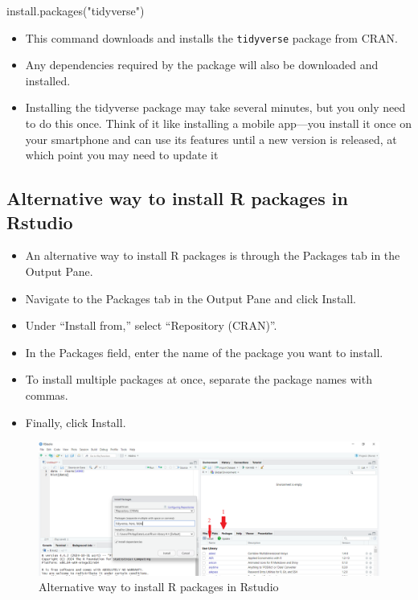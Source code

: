 \documentclass[
  letterpaper,
  DIV=11,
  numbers=noendperiod]{scrreprt}
\newenvironment{Shaded}{\begin{snugshade}}{\end{snugshade}}
\newcommand{\FunctionTok}[1]{\textcolor[rgb]{0.28,0.35,0.67}{#1}}
\newcommand{\NormalTok}[1]{\textcolor[rgb]{0.00,0.23,0.31}{#1}}
\newcommand{\StringTok}[1]{\textcolor[rgb]{0.13,0.47,0.30}{#1}}
\begin{document}
\begin{Shaded}
\begin{Highlighting}[]
\FunctionTok{install.packages}\NormalTok{(}\StringTok{"tidyverse"}\NormalTok{)}
\end{Highlighting}
\end{Shaded}

\begin{itemize}
\item
  This command downloads and installs the \texttt{tidyverse} package
  from CRAN.
\item
  Any dependencies required by the package will also be downloaded and
  installed.
\item
  Installing the tidyverse package may take several minutes, but you
  only need to do this once. Think of it like installing a mobile
  app---you install it once on your smartphone and can use its features
  until a new version is released, at which point you may need to update
  it
\end{itemize}

\subsection{Alternative way to install R packages in
Rstudio}\label{alternative-way-to-install-r-packages-in-rstudio}

\begin{itemize}
\item
  An alternative way to install R packages is through the Packages tab
  in the Output Pane.
\item
  Navigate to the Packages tab in the Output Pane and click Install.
\item
  Under ``Install from,'' select ``Repository (CRAN)''.
\item
  In the Packages field, enter the name of the package you want to
  install.
\item
  To install multiple packages at once, separate the package names with
  commas.
\item
  Finally, click Install.
\end{itemize}

\begin{figure}[H]

{\centering \includegraphics[width=1\textwidth,height=\textheight]{fig/2_install_packages.png}

}

\caption{Alternative way to install R packages in Rstudio}

\end{figure}%
\end{document}
